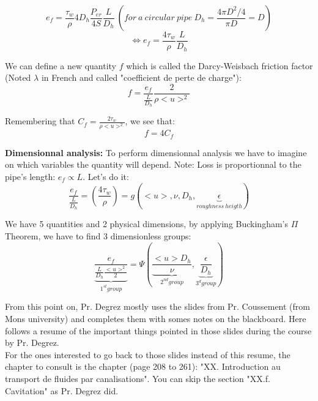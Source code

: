 \begin{equation}
e_f=\frac{\tau_w}{\rho} 4D_h \frac{P_{er}}{4S}\frac{L}{D_h} \ (for \ a \ circular \ pipe \ D_h=\frac{4 \pi D^2/4}{\pi D}=D)
\end{equation}
\begin{equation}
\Leftrightarrow e_f=\frac{4 \tau_w}{\rho} \frac{L}{D_h}
\end{equation}

We can define a new quantity $f$ which is called the Darcy-Weisbach friction factor (Noted $\lambda$ in French and called "coefficient de perte de charge"):
\begin{equation}
f=\frac{e_f}{\frac{L}{D_h}}\frac{2}{\rho <u>^2}
\end{equation}

Remembering that $C_f=\frac{2 \tau_w}{\rho <u>^2}$, we see that:
\begin{equation}
f=4C_f
\end{equation}

\textbf{Dimensionnal analysis:} To perform dimensionnal analysis we have to imagine on which variables the quantity will depend.
Note: Loss is proportionnal to the pipe's length: $e_f \propto L$. Let's do it:
\begin{equation}
\frac{e_f}{\frac{L}{D_h}}=(\frac{4 \tau_w}{\rho})=g(<u>, \nu, D_h, \underbrace{\epsilon}_{roughness \ heigth})
\end{equation}

We have 5 quantities and 2 physical dimensions, by applying Buckingham's $\Pi$ Theorem, we have to find 3 dimensionless groups:
\begin{equation}
\underbrace{\frac{e_f}{\frac{L}{D_h} \frac{<u>^2}{2}}}_{1^{st}group}=\Psi(\underbrace{\frac{<u>D_h}{\nu}}_{2^{nd}group},\underbrace{\frac{\epsilon}{D_h}}_{3^{d}group})
\end{equation}

From this point on, Pr. Degrez mostly uses the slides from Pr. Coussement (from Mons university) and completes them with somes notes on the blackboard. Here follows a resume of the important things pointed in those slides during the course by Pr. Degrez.
\\

For the ones interested to go back to those slides instead of this resume, the chapter to consult is the chapter (page 208 to 261): "XX. Introduction au transport de fluides par canalisations". You can skip the section "XX.f. Cavitation" as Pr. Degrez did.
\\

